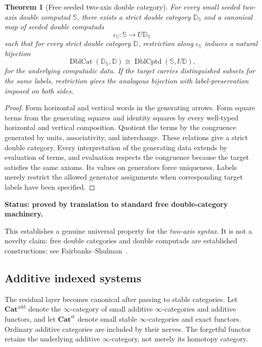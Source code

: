 \documentclass[11pt]{article}
\newtheorem{theorem}{Theorem}[section]
\theoremstyle{definition}
\theoremstyle{remark}
\newcommand{\status}[1]{\textbf{Status: #1.}}
\begin{document}
\begin{theorem}[Free seeded two-axis double category]\label{thm:free-double}
For every small seeded two-axis double computad $\mathbb S$, there exists a strict double category $\mathbb D_{\mathbb S}$ and a canonical map of seeded double computads
\[
\iota_{\mathbb S}:\mathbb S\longrightarrow U\mathbb D_{\mathbb S}
\]
such that for every strict double category $\mathbb D$, restriction along $\iota_{\mathbb S}$ induces a natural bijection
\[
\operatorname{DblCat}(\mathbb D_{\mathbb S},\mathbb D)
\cong
\operatorname{DblCptd}(\mathbb S,U\mathbb D),
\]
for the underlying computadic data. If the target carries distinguished subsets for the same labels, restriction gives the analogous bijection with label-preservation imposed on both sides.
\end{theorem}

\begin{proof}
Form horizontal and vertical words in the generating arrows. Form square terms from the generating squares and identity squares by every well-typed horizontal and vertical composition. Quotient the terms by the congruence generated by units, associativity, and interchange. These relations give a strict double category. Every interpretation of the generating data extends by evaluation of terms, and evaluation respects the congruence because the target satisfies the same axioms. Its values on generators force uniqueness. Labels merely restrict the allowed generator assignments when corresponding target labels have been specified.
\end{proof}

\status{proved by translation to standard free double-category machinery}

This establishes a genuine universal property for the \emph{two-axis syntax}. It is not a novelty claim: free double categories and double computads are established constructions; see Fairbanks--Shulman~\cite{FairbanksShulman2026}.

\subsection{Additive indexed systems}

The residual layer becomes canonical after passing to stable categories. Let $\mathbf{Cat}^{\mathrm{add}}$ denote the $\infty$-category of small additive $\infty$-categories and additive functors, and let $\mathbf{Cat}^{\mathrm{st}}$ denote small stable $\infty$-categories and exact functors. Ordinary additive categories are included by their nerves. The forgetful functor retains the underlying additive $\infty$-category, not merely its homotopy category.
\end{document}
